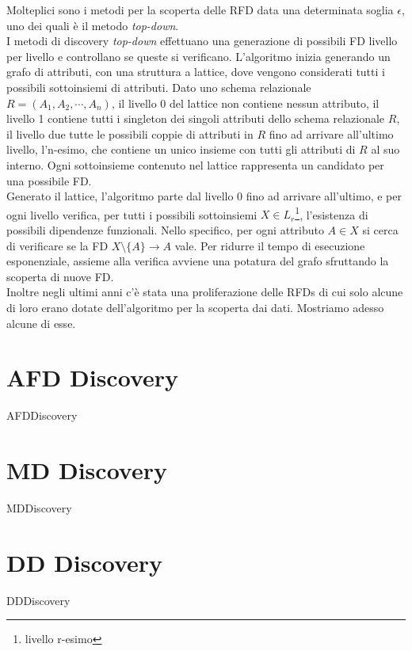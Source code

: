 Molteplici sono i metodi per la scoperta delle RFD data una determinata soglia $\epsilon$, uno dei quali è il metodo \textit{top-down}.\\
I metodi di discovery \textit{top-down} effettuano una generazione di possibili FD livello per livello e controllano se queste si verificano. L'algoritmo inizia generando un grafo di attributi, con una struttura a lattice, dove vengono considerati tutti i possibili sottoinsiemi di attributi. Dato uno schema relazionale $R = (A_1, A_2, \cdots, A_n)$, il livello 0 del lattice non contiene nessun attributo, il livello 1 contiene tutti i singleton dei singoli attributi dello schema relazionale $R$, il livello due tutte le possibili coppie di attributi in $R$ fino ad arrivare all'ultimo livello, l'n-esimo, che contiene un unico insieme con tutti gli attributi di $R$ al suo interno. Ogni sottoinsieme contenuto nel lattice rappresenta un candidato per una possibile FD.\\
Generato il lattice, l'algoritmo parte dal livello 0 fino ad arrivare all'ultimo, e per ogni livello verifica, per tutti i possibili sottoinsiemi $X \in L_r$\footnote{livello r-esimo}, l'esistenza di possibili dipendenze funzionali. Nello specifico, per ogni attributo $A \in X$ si cerca di verificare se la FD $X \setminus \{A\} \rightarrow A$ vale. Per ridurre il tempo di esecuzione esponenziale, assieme alla verifica avviene una potatura del grafo sfruttando la scoperta di nuove FD.\\
Inoltre negli ultimi anni c'è stata una proliferazione delle RFDs di cui solo alcune di loro erano dotate dell'algoritmo per la scoperta dai dati. Mostriamo adesso alcune di esse.


\section{AFD Discovery}
{AFDDiscovery}
\section{MD Discovery}
{MDDiscovery}
\section{DD Discovery}
{DDDiscovery}